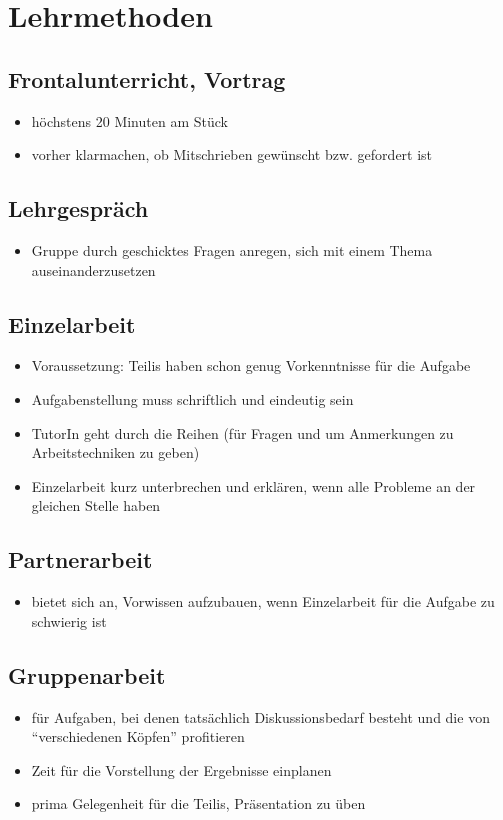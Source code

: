 \chapter{Lehrmethoden}
\section{Frontalunterricht, Vortrag}
\begin{itemize}
 \item höchstens 20 Minuten am Stück
 \item vorher klarmachen, ob Mitschrieben gewünscht bzw. gefordert ist
\end{itemize}

\section{Lehrgespräch}
\begin{itemize}
 \item Gruppe durch geschicktes Fragen anregen, sich mit einem Thema auseinanderzusetzen
\end{itemize}

\section{Einzelarbeit}
\begin{itemize}
 \item Voraussetzung: Teilis haben schon genug Vorkenntnisse für die Aufgabe
 \item Aufgabenstellung muss schriftlich und eindeutig sein
 \item TutorIn geht durch die Reihen (für Fragen und um Anmerkungen zu Arbeitstechniken zu geben)
 \item Einzelarbeit kurz unterbrechen und erklären, wenn alle Probleme an der gleichen Stelle haben
\end{itemize}

\section{Partnerarbeit}
\begin{itemize}
 \item bietet sich an, Vorwissen aufzubauen, wenn Einzelarbeit für die Aufgabe zu schwierig ist
\end{itemize}

\section{Gruppenarbeit}
\begin{itemize}
 \item für Aufgaben, bei denen tatsächlich Diskussionsbedarf besteht und die von ``verschiedenen Köpfen'' profitieren
 \item Zeit für die Vorstellung der Ergebnisse einplanen
 \item prima Gelegenheit für die Teilis, Präsentation zu üben
\end{itemize}

